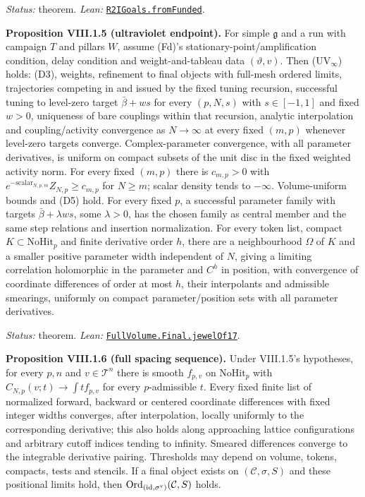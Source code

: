 \documentclass[
  letterpaper,
  11pt]{article}
\begin{document}
\emph{Status:} theorem. \emph{Lean:}
\href{https://github.com/yang-mills-group/OpenAI-YM-20261028/blob/3456e5e75cf8d4cd558955a5c7638fba2d68f464/YM/R2I/Campaign/Accepted.lean\#L150-L167}{\texttt{R2IGoals.fromFunded}}.

\textbf{Proposition VIII.1.5 (ultraviolet endpoint).} For simple
\(\mathfrak g\) and a run with campaign \(T\) and pillars \(W\), assume
(Fd)'s stationary-point/amplification condition, delay condition and
weight-and-tableau data \((\vartheta,v)\). Then (UV\(_\infty\)) holds:
(D3), weights, refinement to final objects with full-mesh ordered
limits, trajectories competing in and issued by the fixed tuning
recursion, successful tuning to level-zero target \(\bar\beta+ws\) for
every \((p,N,s)\) with \(s\in[-1,1]\) and fixed \(w>0\), uniqueness of
bare couplings within that recursion, analytic interpolation and
coupling/activity convergence as \(N\to\infty\) at every fixed \((m,p)\)
whenever level-zero targets converge. Complex-parameter convergence,
with all parameter derivatives, is uniform on compact subsets of the
unit disc in the fixed weighted activity norm. For every fixed \((m,p)\)
there is \(c_{m,p}>0\) with
\(e^{-\mathrm{scalar}_{N,p,m}}Z_{N,p}\ge c_{m,p}\) for \(N\ge m\);
scalar density tends to \(-\infty\). Volume-uniform bounds and (D5)
hold. For every fixed \(p\), a successful parameter family with targets
\(\bar\beta+\lambda ws\), some \(\lambda>0\), has the chosen family as
central member and the same step relations and insertion normalization.
For every token list, compact \(K\subset\mathrm{NoHit}_p\) and finite
derivative order \(h\), there are a neighbourhood \(\Omega\) of \(K\)
and a smaller positive parameter width independent of \(N\), giving a
limiting correlation holomorphic in the parameter and \(C^h\) in
position, with convergence of coordinate differences of order at most
\(h\), their interpolants and admissible smearings, uniformly on compact
parameter/position sets with all parameter derivatives.

\emph{Status:} theorem. \emph{Lean:}
\href{https://github.com/yang-mills-group/OpenAI-YM-20261028/blob/3456e5e75cf8d4cd558955a5c7638fba2d68f464/YM/RG17/Joint.lean\#L102-L111}{\texttt{FullVolume.Final.jewelOf17}}.

\textbf{Proposition VIII.1.6 (full spacing sequence).} Under VIII.1.5's
hypotheses, for every \(p,n\) and \(v\in\mathcal T^n\) there is smooth
\(f_{p,v}\) on \(\mathrm{NoHit}_p\) with
\(C_{N,p}(v;t)\to\int tf_{p,v}\) for every \(p\)-admissible \(t\). Every
fixed finite list of normalized forward, backward or centered coordinate
differences with fixed integer widths converges, after interpolation,
locally uniformly to the corresponding derivative; this also holds along
approaching lattice configurations and arbitrary cutoff indices tending
to infinity. Smeared differences converge to the integrable derivative
pairing. Thresholds may depend on volume, tokens, compacts, tests and
stencils. If a final object exists on \((\mathcal C,\sigma,S)\) and
these positional limits hold, then
\(\mathrm{Ord}_{(\mathrm{id},\sigma^{\rm v})}(\mathcal C,S)\) holds.
\end{document}
